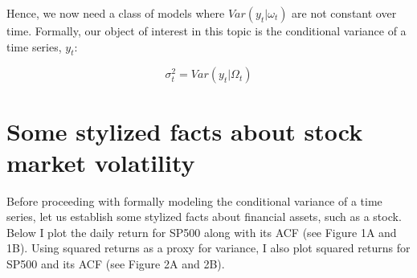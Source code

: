 \documentclass[]{book}
\theoremstyle{definition}
\theoremstyle{definition}
\theoremstyle{definition}
\theoremstyle{remark}
\begin{document}
Hence, we now need a class of models where \(Var(y_t|\omega_t)\) are not
constant over time. Formally, our object of interest in this topic is
the conditional variance of a time series, \(y_t\):

\[\sigma_t^2=Var(y_t|\Omega_t)\]

\hypertarget{some-stylized-facts-about-stock-market-volatility}{%
\section{Some stylized facts about stock market
volatility}\label{some-stylized-facts-about-stock-market-volatility}}

Before proceeding with formally modeling the conditional variance of a
time series, let us establish some stylized facts about financial
assets, such as a stock. Below I plot the daily return for SP500 along
with its ACF (see Figure 1A and 1B). Using squared returns as a proxy
for variance, I also plot squared returns for SP500 and its ACF (see
Figure 2A and 2B).
\end{document}
